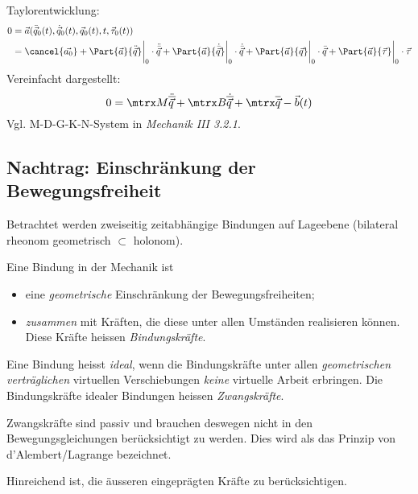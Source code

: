 		Taylorentwicklung:
		\begin{align*}
			0 &= \vec a(\ddot{\vec q}_0(t), \dot{\vec q}_0(t), \vec q_0(t), t, \vec\tau_0(t)) \\
			&= \cancel{\vec{a_0}} + \Part{\vec a}{\ddot{\vec q}} \bigg|_0 \cdot \ddot{\bar{\vec q}} + \Part{\vec a}{\dot{\bar{\vec q}}} \bigg|_0 \cdot \dot{\bar{\vec q}} + \Part{\vec a}{\vec q} \bigg|_0 \cdot \bar{\vec q} + \Part{\vec a}{\vec\tau} \bigg|_0 \cdot \vec\tau
		\end{align*}
		Vereinfacht dargestellt:
		\[
			0 = \mtrx M \ddot{\overline{\vec q}} + \mtrx B \dot{\overline{\vec q}} + \mtrx \overline{\vec q} - \vec b(t)
		\]
		Vgl. M-D-G-K-N-System in \emph{Mechanik III 3.2.1}.
	
	\subsection{Nachtrag: Einschränkung der Bewegungsfreiheit} %
		Betrachtet werden zweiseitig zeitabhängige Bindungen auf Lageebene (bilateral rheonom geometrisch $\subset$ holonom).
		
		\begin{definition}
			Eine Bindung in der Mechanik ist
			\begin{itemize}
				\item eine \emph{geometrische} Einschränkung der Bewegungsfreiheiten;
				\item \emph{zusammen} mit Kräften, die diese unter allen Umständen realisieren können. Diese Kräfte heissen \emph{Bindungskräfte}.
			\end{itemize}
		\end{definition}
		
		\begin{definition}
			Eine Bindung heisst \emph{ideal}, wenn die Bindungskräfte unter allen \emph{geometrischen verträglichen} virtuellen Verschiebungen \emph{keine} virtuelle Arbeit erbringen. Die Bindungskräfte idealer Bindungen heissen \emph{Zwangskräfte}.
		\end{definition}
		
		\begin{folgerung}
			Zwangskräfte sind passiv und brauchen deswegen nicht in den Bewegungsgleichungen berücksichtigt zu werden. Dies wird als das Prinzip von d'Alembert/Lagrange bezeichnet.
		\end{folgerung}
		
		Hinreichend ist, die äusseren eingeprägten Kräfte zu berücksichtigen.
	
